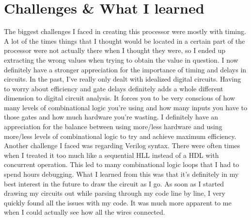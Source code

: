 \documentclass[letterpaper]{article} %
\begin{document}
\section{Challenges \& What I learned}

    The biggest challenges I faced in creating this processor were mostly with timing. A lot of the times things that I thought would be located in a certain part of the processor were not actually there when I thought they were, so I ended up extracting the wrong values when trying to obtain the value in question. I now definitely have a stronger appreciation for the importance of timing and delays in circuits. In the past, I've really only dealt with idealized digital circuits. Having to worry about efficiency and gate delays definitely adds a whole different dimension to digital circuit analysis. It forces you to be very conscious of how many levels of combinational logic you're using and how many inputs you have to those gates and how much hardware you're wasting. I definitely have an appreciation for the balance between using more/less hardware and using more/less levels of combinational logic to try and achieve maximum efficiency. \\
    
    Another challenge I faced was regarding Verilog syntax. There were often times when I treated it too much like a sequential HLL instead of a HDL with concurrent operation. This led to many combinational logic loops that I had to spend hours debugging. What I learned from this was that it's definitely in my best interest in the future to draw the circuit as I go. As soon as I started drawing my circuits out while parsing through my code line by line, I very quickly found all the issues with my code. It was much more apparent to me when I could actually see how all the wires connected.
    
    

    
\end{document}
